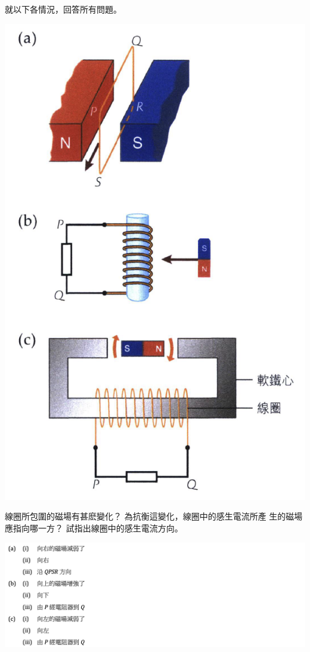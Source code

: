 {
    就以下各情況，回答所有問題。
    \par{\par\includegraphics[width=.35\textwidth]{./img/ch5_induction_lq_2024-06-24-17-25-22.png}\par}
    \begin{subparts}
        \subpart 線圈所包圍的磁場有甚麽變化？
        \subpart 為抗衡這變化，線圈中的感生電流所產 生的磁場應指向哪一方？
        \subpart 試指出線圈中的感生電流方向。
    \end{subparts}
    \par {}
}{\par{\par\centering\includegraphics[width=\textwidth]{./img/ch5_induction_lq_2024-06-24-17-36-30.png}\par}}


